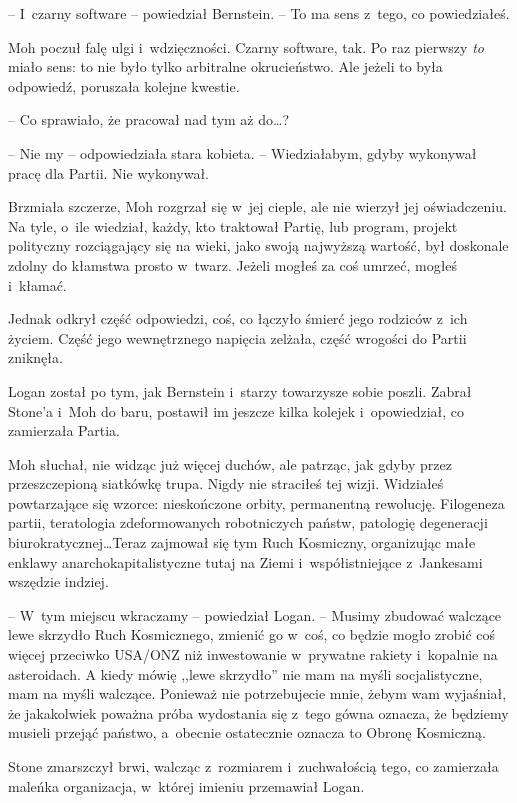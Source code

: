 \documentclass[oneside,polish,11pt,sfheadings]{mwbk}
\begin{document}
-- I~czarny software -- powiedział Bernstein. -- To ma sens z~tego, co
powiedziałeś.

Moh poczuł falę ulgi i~wdzięczności. Czarny software, tak. Po raz
pierwszy \emph{to} miało sens: to nie było tylko arbitralne
okrucieństwo. Ale jeżeli to była odpowiedź, poruszała kolejne kwestie.

-- Co sprawiało, że pracował nad tym aż do\ldots?

-- Nie my -- odpowiedziała stara kobieta. -- Wiedziałabym, gdyby wykonywał
pracę dla Partii. Nie wykonywał.

Brzmiała szczerze, Moh rozgrzał się w~jej cieple, ale nie wierzył jej
oświadczeniu. Na tyle, o~ile wiedział, każdy, kto traktował Partię, lub
program, projekt polityczny rozciągający się na wieki, jako swoją
najwyższą wartość, był doskonale zdolny do kłamstwa prosto w~twarz.
Jeżeli mogłeś za coś umrzeć, mogłeś i~kłamać.

Jednak odkrył część odpowiedzi, coś, co łączyło śmierć jego rodziców z~ich życiem. Część jego wewnętrznego napięcia zelżała, część wrogości do
Partii zniknęła.

Logan został po tym, jak Bernstein i~starzy towarzysze sobie poszli.
Zabrał Stone'a i~Moh do baru, postawił im jeszcze kilka kolejek i~opowiedział, co zamierzała Partia.

Moh słuchał, nie widząc już więcej duchów, ale patrząc, jak gdyby przez
przeszczepioną siatkówkę trupa. Nigdy nie straciłeś tej wizji. Widziałeś
powtarzające się wzorce: nieskończone orbity, permanentną rewolucję.
Filogeneza partii, teratologia zdeformowanych robotniczych państw,
patologię degeneracji biurokratycznej\ldots Teraz zajmował się tym Ruch
Kosmiczny, organizując małe enklawy anarchokapitalistyczne tutaj na
Ziemi i~współistniejące z~Jankesami wszędzie indziej.

-- W~tym miejscu wkraczamy -- powiedział Logan. -- Musimy zbudować walczące
lewe skrzydło Ruch Kosmicznego, zmienić go w~coś, co będzie mogło zrobić
coś więcej przeciwko USA/ONZ niż inwestowanie w~prywatne rakiety i~kopalnie na asteroidach. A kiedy mówię ,,lewe skrzydło'' nie mam na myśli
socjalistyczne, mam na myśli walczące. Ponieważ nie potrzebujecie mnie,
żebym wam wyjaśniał, że jakakolwiek poważna próba wydostania się z~tego
gówna oznacza, że będziemy musieli przejąć państwo, a~obecnie
ostatecznie oznacza to Obronę Kosmiczną.

Stone zmarszczył brwi, walcząc z~rozmiarem i~zuchwałością tego, co
zamierzała maleńka organizacja, w~której imieniu przemawiał Logan. 
\end{document}
